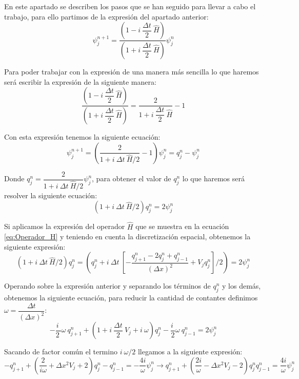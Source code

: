 \documentclass[10pt,onecolumn]{article}
\begin{document}
En este apartado se describen los pasos que se han seguido para llevar a cabo el trabajo, para ello partimos de la expresión del apartado anterior:
\begin{equation}
    \psi^{n+1}_j =\dfrac{(1 - i\ \dfrac{\Delta t}{2}\ \hat{H})}{(1 + i\ \dfrac{\Delta t}{2}\ \hat{H})}\psi^n_j
\end{equation}

Para poder trabajar con la expresión de una manera más sencilla lo que haremos será escribir la expresión de la siguiente manera:
\begin{equation}
    \dfrac{(1 - i\ \dfrac{\Delta t}{2}\ \hat{H})}{(1 + i\ \dfrac{\Delta t}{2}\ \hat{H})} = \dfrac{2}{1+i\ \dfrac{\Delta t}{2}\ \hat{H}} -1
\end{equation}

Con esta expresión tenemos la siguiente ecuación:
\begin{equation}\label{eq:Relacion_q_psi}
    \psi^{n+1}_j = (\dfrac{2}{1+i\ \Delta t\ \hat{H}/2} - 1)\psi^n_j = q^n_j - \psi^n_j
\end{equation}

Donde $q^n_j = \dfrac{2}{1+i\ \Delta t\ \hat{H}/2}\psi^n_j$, para obtener el valor de $q^n_j$ lo que haremos será resolver la siguiente ecuación:
\begin{equation}
    (1+i\ \Delta t\ \hat{H}/2)q^n_j = 2\psi^n_j
\end{equation}

Si aplicamos la expresión del operador $\hat{H}$ que se muestra en la ecuación \ref{eq:Operador_H} y teniendo en cuenta la discretización espacial, obtenemos la siguiente expresión:
\begin{equation}
    (1+i\ \Delta t\ \hat{H}/2)q^n_j = (q_j^n+i\ \Delta t\ [-\dfrac{q_{j+1}^{n} - 2q_{j}^{n} + q_{j-1}^{n}}{(\Delta x)^2} + V_{j} q_{j}^{n}]/2) = 2\psi^n_j
\end{equation}


Operando sobre la expresión anterior y separando los términos de $q^n_j$ y los demás, obtenemos la siguiente ecuación, para reducir la cantidad de contantes definimos $\omega = \dfrac{\Delta t}{(\Delta x)^2}$:
\begin{equation}
    -\dfrac{i\ }{2\ }\omega\ q_{j+1}^{n} + (1 + i\ \dfrac{\Delta t}{2}\ V_j + i\ \omega) q_{j}^{n} - \dfrac{i\ }{2 }\omega\  q_{j-1}^{n} = 2\psi^n_j
\end{equation}

Sacando de factor común el termino $i\ \omega/2$ llegamos a la siguiente expresión:
\begin{equation}
    -q_{j+1}^{n} + (\dfrac{2}{i \omega} +\Delta x^2 V_j + 2) q_{j}^{n} - q_{j-1}^{n} = - \dfrac{4i}{\omega}\psi^n_j \rightarrow q_{j+1}^{n} + (\dfrac{2i}{\omega} -\Delta x^2 V_j - 2) q_{j}^{n}  q_{j-1}^{n} = \dfrac{4i}{\omega}\psi^n_j
\end{equation}
\end{document}
